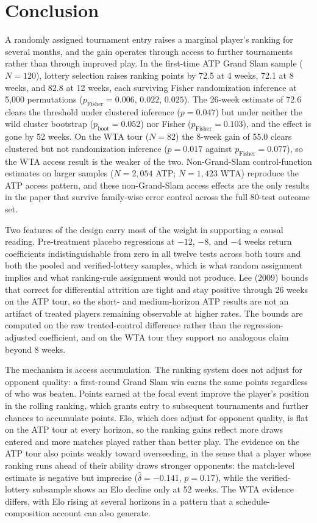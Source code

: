 \section{Conclusion}
\label{sec:conclusion}

A randomly assigned tournament entry raises a marginal player's ranking for several months, and the gain operates through access to further tournaments rather than through improved play. In the first-time ATP Grand Slam sample ($N = 120$), lottery selection raises ranking points by 72.5 at 4 weeks, 72.1 at 8 weeks, and 82.8 at 12 weeks, each surviving Fisher randomization inference at 5{,}000 permutations ($p_{\text{Fisher}} = 0.006$, $0.022$, $0.025$). The 26-week estimate of 72.6 clears the threshold under clustered inference ($p = 0.047$) but under neither the wild cluster bootstrap ($p_{\text{boot}} = 0.052$) nor Fisher ($p_{\text{Fisher}} = 0.103$), and the effect is gone by 52 weeks. On the WTA tour ($N = 82$) the 8-week gain of 55.0 clears clustered but not randomization inference ($p = 0.017$ against $p_{\text{Fisher}} = 0.077$), so the WTA access result is the weaker of the two. Non-Grand-Slam control-function estimates on larger samples ($N = 2{,}054$ ATP; $N = 1{,}423$ WTA) reproduce the ATP access pattern, and these non-Grand-Slam access effects are the only results in the paper that survive family-wise error control across the full 80-test outcome set.

Two features of the design carry most of the weight in supporting a causal reading. Pre-treatment placebo regressions at $-12$, $-8$, and $-4$ weeks return coefficients indistinguishable from zero in all twelve tests across both tours and both the pooled and verified-lottery samples, which is what random assignment implies and what ranking-rule assignment would not produce. Lee (2009) bounds that correct for differential attrition are tight and stay positive through 26 weeks on the ATP tour, so the short- and medium-horizon ATP results are not an artifact of treated players remaining observable at higher rates. The bounds are computed on the raw treated-control difference rather than the regression-adjusted coefficient, and on the WTA tour they support no analogous claim beyond 8 weeks.

The mechanism is access accumulation. The ranking system does not adjust for opponent quality: a first-round Grand Slam win earns the same points regardless of who was beaten. Points earned at the focal event improve the player's position in the rolling ranking, which grants entry to subsequent tournaments and further chances to accumulate points. Elo, which does adjust for opponent quality, is flat on the ATP tour at every horizon, so the ranking gains reflect more draws entered and more matches played rather than better play. The evidence on the ATP tour also points weakly toward overseeding, in the sense that a player whose ranking runs ahead of their ability draws stronger opponents: the match-level estimate is negative but imprecise ($\hat\delta = -0.141$, $p = 0.17$), while the verified-lottery subsample shows an Elo decline only at 52 weeks. The WTA evidence differs, with Elo rising at several horizons in a pattern that a schedule-composition account can also generate.

